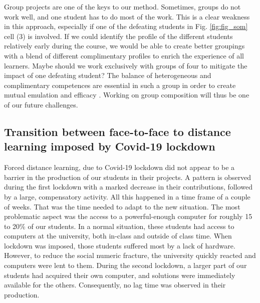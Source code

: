 \documentclass{aims}
\theoremstyle{definition}
\begin{document}
Group projects are one of the keys to our method. Sometimes, groups do
not work well, and one student has to do most of the work. This is a
clear weakness in this approach, especially if one of the defeating
students in Fig. \ref {fig:fig_som} cell (3) is involved. If we could
identify the profile of the different students relatively early during
the course, we would be able to create better groupings with a blend of
different complimentary profiles to enrich the experience of all
learners. Maybe should we work exclusively with groups of four to
mitigate the impact of one defeating student? The balance of
heterogeneous and complimentary competences are essential in such a
group in order to create mutual emulation and efficacy
\cite{Mucchielli1996}. Working on group composition will thus be one of
our future challenges.

\hypertarget{transition-between-face-to-face-to-distance-learning-imposed-by-covid-19-lockdown-2}{%
\subsection{Transition between face-to-face to distance learning imposed
by Covid-19
lockdown}\label{transition-between-face-to-face-to-distance-learning-imposed-by-covid-19-lockdown-2}}

Forced distance learning, due to Covid-19 lockdown did not appear to be
a barrier in the production of our students in their projects. A pattern
is observed during the first lockdown with a marked decrease in their
contributions, followed by a large, compensatory activity. All this
happened in a time frame of a couple of weeks. That was the time needed
to adapt to the new situation. The most problematic aspect was the
access to a powerful-enough computer for roughly 15 to 20\% of our
students. In a normal situation, these students had access to computers
at the university, both in-class and outside of class time. When
lockdown was imposed, those students suffered most by a lack of
hardware. However, to reduce the social numeric fracture, the university
quickly reacted and computers were lent to them. During the second
lockdown, a larger part of our students had acquired their own computer,
and solutions were immediately available for the others. Consequently,
no lag time was observed in their production.
\end{document}
